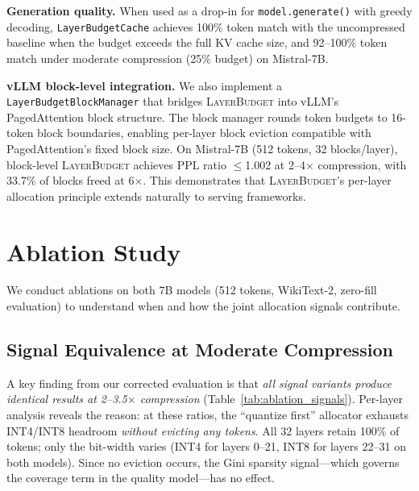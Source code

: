 \documentclass{article}
\newcommand{\layerbudget}{\textsc{LayerBudget}\xspace}
\begin{document}
\textbf{Generation quality.}
When used as a drop-in for \texttt{model.generate()} with greedy decoding, \texttt{LayerBudgetCache} achieves 100\% token match with the uncompressed baseline when the budget exceeds the full KV cache size, and 92--100\% token match under moderate compression (25\% budget) on Mistral-7B.

\textbf{vLLM block-level integration.}
We also implement a \texttt{LayerBudgetBlockManager} that bridges \layerbudget into vLLM's PagedAttention block structure.
The block manager rounds token budgets to 16-token block boundaries, enabling per-layer block eviction compatible with PagedAttention's fixed block size.
On Mistral-7B (512 tokens, 32 blocks/layer), block-level \layerbudget achieves PPL ratio $\leq$1.002 at 2--4$\times$ compression, with 33.7\% of blocks freed at 6$\times$.
This demonstrates that \layerbudget's per-layer allocation principle extends naturally to serving frameworks.

\section{Ablation Study}
\label{sec:ablation}

We conduct ablations on both 7B models (512 tokens, WikiText-2, zero-fill evaluation) to understand when and how the joint allocation signals contribute.

\subsection{Signal Equivalence at Moderate Compression}

A key finding from our corrected evaluation is that \emph{all signal variants produce identical results at 2--3.5$\times$ compression} (Table~\ref{tab:ablation_signals}).
Per-layer analysis reveals the reason: at these ratios, the ``quantize first'' allocator exhausts INT4/INT8 headroom \emph{without evicting any tokens}.
All 32 layers retain 100\% of tokens; only the bit-width varies (INT4 for layers 0--21, INT8 for layers 22--31 on both models).
Since no eviction occurs, the Gini sparsity signal---which governs the coverage term in the quality model---has no effect.
\end{document}
